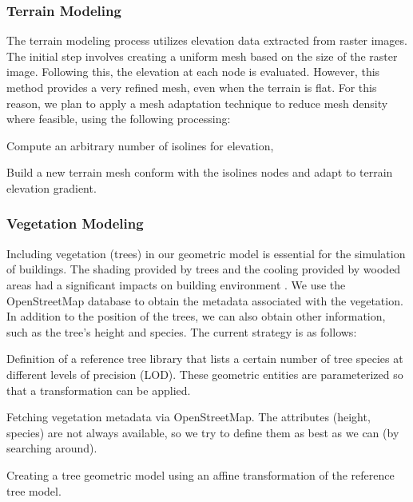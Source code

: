 \documentclass[runningheads]{llncs}
\begin{document}
\subsubsection{Terrain Modeling}
The terrain modeling process utilizes elevation data extracted from raster images. The initial step involves creating a uniform mesh based on the size of the raster image. Following this, the elevation at each node is evaluated.
However, this method provides a very refined mesh, even when the terrain is flat. For this reason, we plan to apply a mesh adaptation technique to reduce mesh density where feasible, using the following processing:
\begin{inparaenum}[\it (i)]
    \item Compute an arbitrary number of isolines for elevation,
    \item Build a new terrain mesh conform with the isolines nodes and adapt to terrain elevation gradient.
\end{inparaenum}

\subsubsection{Vegetation Modeling}

Including vegetation (trees) in our geometric model is essential for the simulation of buildings. The shading provided by trees and the cooling provided by wooded areas had a significant impacts on building environment  . We use the OpenStreetMap database to obtain the metadata associated with the vegetation. In addition to the position of the trees, we can also obtain other information, such as the tree's height and species. The current strategy is as follows:
\begin{inparaenum}[\it (i)]
\item Definition of a reference tree library that lists a certain number of tree species at different levels of precision (LOD). These geometric entities are parameterized so that a transformation can be applied.
\item Fetching vegetation metadata via OpenStreetMap. The attributes (height, species) are not always available, so we try to define them as best as we can (by searching around).
\item Creating a tree geometric model using an affine transformation of the reference tree model.
\end{inparaenum}
\end{document}

